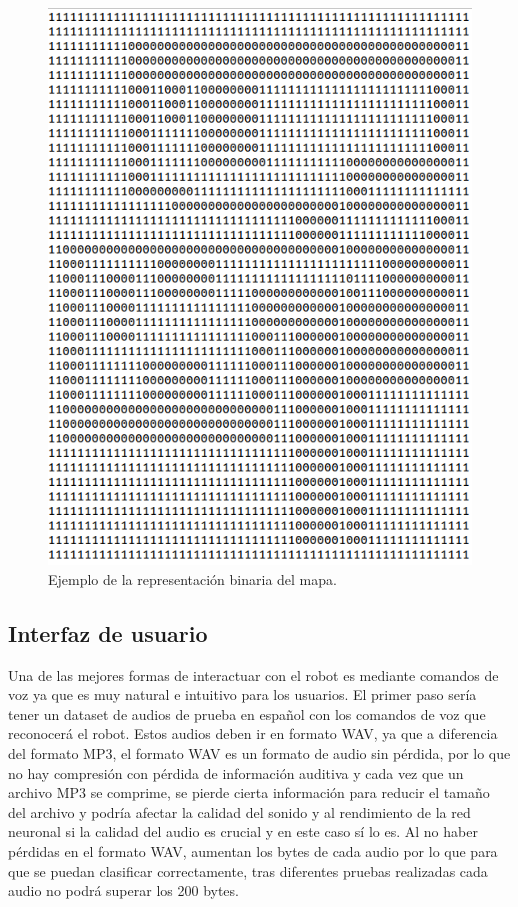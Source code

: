 \begin{figure}[H]
  \centering
  \includegraphics[scale=0.5]{figs/bin} %
  \caption{ Ejemplo de la representación binaria del mapa.}
  \label{fig:bin}
\end{figure}


\subsection{Interfaz de usuario}
\label{subsec:interfaz_usuario}

Una de las mejores formas de interactuar con el robot es mediante comandos de voz ya que es muy natural e intuitivo para los usuarios. El primer paso sería tener un dataset de audios de prueba en español con los comandos de voz que reconocerá el robot. Estos audios deben ir en formato WAV, ya que a diferencia del formato MP3, el formato WAV es un formato de audio sin pérdida, por lo que no hay compresión con pérdida de información auditiva y cada vez que un archivo MP3 se comprime, se pierde cierta información para reducir el tamaño del archivo y podría afectar la calidad del sonido y al rendimiento de la red neuronal si la calidad del audio es crucial y en este caso sí lo es. Al no haber pérdidas en el formato WAV, aumentan los bytes de cada audio por lo que para que se puedan clasificar correctamente, tras diferentes pruebas realizadas cada audio no podrá superar los 200 bytes.\\

